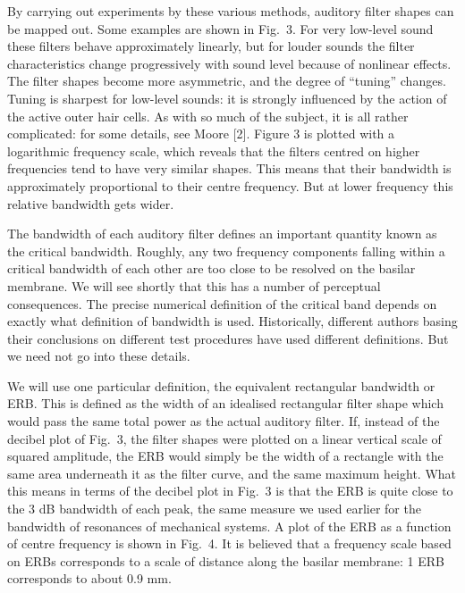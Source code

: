   By carrying out experiments by these various methods, auditory filter shapes 
  can be mapped out. Some examples are shown in Fig.\ 3. For very low-level 
  sound these filters behave approximately linearly, but for louder sounds the 
  filter characteristics change progressively with sound level because of 
  nonlinear effects. The filter shapes become more asymmetric, and the degree 
  of ``tuning'' changes. Tuning is sharpest for low-level sounds: it is 
  strongly influenced by the action of the active outer hair cells. As with so 
  much of the subject, it is all rather complicated: for some details, see 
  Moore [2]. Figure 3 is plotted with a logarithmic frequency scale, which 
  reveals that the filters centred on higher frequencies tend to have very 
  similar shapes. This means that their bandwidth is approximately proportional 
  to their centre frequency. But at lower frequency this relative bandwidth 
  gets wider. 


  The bandwidth of each auditory filter defines an important quantity known as 
  the critical bandwidth. Roughly, any two frequency components falling within 
  a critical bandwidth of each other are too close to be resolved on the 
  basilar membrane. We will see shortly that this has a number of perceptual 
  consequences. The precise numerical definition of the critical band depends 
  on exactly what definition of bandwidth is used. Historically, different 
  authors basing their conclusions on different test procedures have used 
  different definitions. But we need not go into these details. 

  We will use one particular definition, the equivalent rectangular bandwidth 
  or ERB. This is defined as the width of an idealised rectangular filter shape 
  which would pass the same total power as the actual auditory filter. If, 
  instead of the decibel plot of Fig.\ 3, the filter shapes were plotted on a 
  linear vertical scale of squared amplitude, the ERB would simply be the width 
  of a rectangle with the same area underneath it as the filter curve, and the 
  same maximum height. What this means in terms of the decibel plot in Fig.\ 3 
  is that the ERB is quite close to the 3 dB bandwidth of each peak, the same 
  measure we used earlier for the bandwidth of resonances of mechanical 
  systems. A plot of the ERB as a function of centre frequency is shown in 
  Fig.\ 4. It is believed that a frequency scale based on ERBs corresponds to a 
  scale of distance along the basilar membrane: 1 ERB corresponds to about 0.9 
  mm. 

